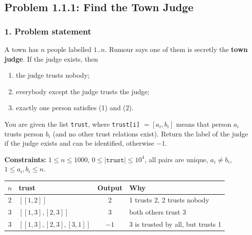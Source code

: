 \subsection{Problem 1.1.1: Find the Town Judge}


\subsubsection*{1. Problem statement}

A town has $n$ people labelled $1..n$. Rumour says one of them is secretly the \textbf{town judge}. If the judge exists, then
\begin{enumerate}[leftmargin=*, label=(\arabic*)]
    \item the judge trusts nobody;
    \item everybody except the judge trusts the judge;
    \item exactly one person satisfies (1) and (2).
\end{enumerate}
You are given the list \texttt{trust}, where \texttt{trust[i]} $= [a_i, b_i]$ means that person $a_i$ trusts person $b_i$ (and no other trust relations exist). Return the label of the judge if the judge exists and can be identified, otherwise $-1$.

\textbf{Constraints:} $1 \le n \le 1000$, \; $0 \le |\texttt{trust}| \le 10^4$, \; all pairs are unique, \; $a_i \ne b_i$, \; $1 \le a_i, b_i \le n$.

\begin{table}[H]
\centering\small
\begin{tabular}{@{}clcl@{}}
\toprule
$n$ & \textbf{trust} & \textbf{Output} & \textbf{Why} \\
\midrule
2 & $[[1,2]]$ & 2 & 1 trusts 2, 2 trusts nobody \\
3 & $[[1,3],[2,3]]$ & 3 & both others trust 3 \\
3 & $[[1,3],[2,3],[3,1]]$ & $-1$ & 3 is trusted by all, but trusts 1 \\
\bottomrule
\end{tabular}
\end{table}

